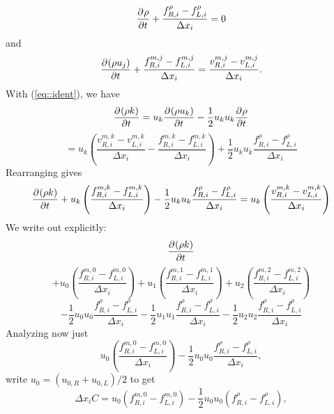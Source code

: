\documentclass[12pt]{article}
\numberwithin{equation}{section}
\numberwithin{figure}{section}
\begin{document}
\begin{equation}
\frac{\partial^{} \rho}{\partial t^{}} + \frac{f_{R,i}^\rho - f_{L,i}^\rho}{\Delta x_i} = 0
\end{equation}
and
\begin{equation}
\frac{\partial^{} (\rho u_j)}{\partial t^{}} + \frac{f_{R,i}^{m,j} - f_{L,i}^{m,j}}{\Delta x_i} = \frac{v_{R,i}^{m,j} - v_{L,i}^{m,j}}{\Delta x_i}.
\end{equation}
With (\ref{eq::ident}), we have
\begin{equation*}
\frac{\partial^{} (\rho k)}{\partial t^{}} = u_k\frac{\partial^{} (\rho u_k)}{\partial t^{}} - \frac{1}{2}u_ku_k\frac{\partial^{} \rho}{\partial t^{}}
\end{equation*}
\begin{equation}
= u_k\left(\frac{v_{R,i}^{m,k} - v_{L,i}^{m,k}}{\Delta x_i} - \frac{f_{R,i}^{m,k} - f_{L,i}^{m,k}}{\Delta x_i}\right) + \frac{1}{2}u_ku_k\frac{f_{R,i}^\rho - f_{L,i}^\rho}{\Delta x_i}
\end{equation}
Rearranging gives
\begin{equation}
\frac{\partial^{} (\rho k)}{\partial t^{}} + u_k\left(\frac{f_{R,i}^{m,k} - f_{L,i}^{m,k}}{\Delta x_i}\right) - \frac{1}{2}u_ku_k\frac{f_{R,i}^\rho - f_{L,i}^\rho}{\Delta x_i}
= u_k\left(\frac{v_{R,i}^{m,k} - v_{L,i}^{m,k}}{\Delta x_i}\right)
\end{equation}
We write out explicitly:
\begin{equation*}
\frac{\partial^{} (\rho k)}{\partial t^{}}
\end{equation*}
\begin{equation*}
+ u_0\left(\frac{f_{R,i}^{m,0} - f_{L,i}^{m,0}}{\Delta x_i}\right)
+ u_1\left(\frac{f_{R,i}^{m,1} - f_{L,i}^{m,1}}{\Delta x_i}\right)
+ u_2\left(\frac{f_{R,i}^{m,2} - f_{L,i}^{m,2}}{\Delta x_i}\right)
\end{equation*}
\begin{equation*}
- \frac{1}{2}u_0u_0\frac{f_{R,i}^\rho - f_{L,i}^\rho}{\Delta x_i}
- \frac{1}{2}u_1u_1\frac{f_{R,i}^\rho - f_{L,i}^\rho}{\Delta x_i}
- \frac{1}{2}u_2u_2\frac{f_{R,i}^\rho - f_{L,i}^\rho}{\Delta x_i}
\end{equation*}
Analyzing now just
\begin{equation}
u_0\left(\frac{f_{R,i}^{m,0} - f_{L,i}^{m,0}}{\Delta x_i}\right) - \frac{1}{2}u_0u_0\frac{f_{R,i}^\rho - f_{L,i}^\rho}{\Delta x_i},
\end{equation}
write $u_0 = (u_{0,R} + u_{0,L})/2$ to get
\begin{equation}
\Delta x_i C = u_0\left(f_{R,i}^{m,0} - f_{L,i}^{m,0}\right) - \frac{1}{2}u_0u_0\left(f_{R,i}^\rho - f_{L,i}^\rho\right),
\end{equation}
\end{document}
